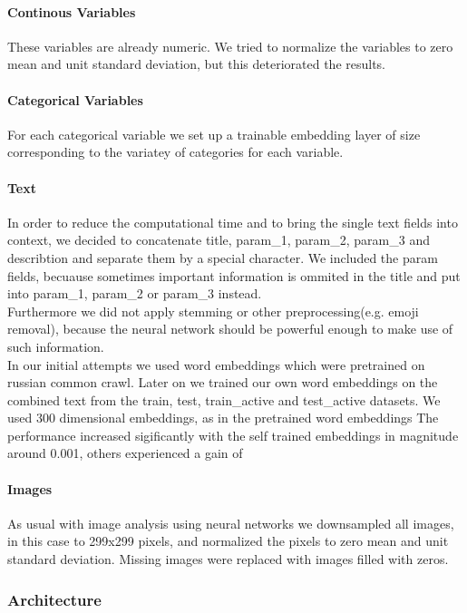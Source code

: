 \documentclass[runningheads]{llncs}
\begin{document}
 \paragraph{Continous Variables} These variables are already numeric. We tried to normalize the variables to zero mean and unit standard deviation, but this deteriorated the results. %
 \paragraph{Categorical Variables} For each categorical variable we set up a trainable embedding layer of size corresponding to the variatey of categories for each variable. %
 \paragraph{Text} In order to reduce the computational time and to bring the single text fields into context, we decided to concatenate title, param\_1, param\_2, param\_3 and  describtion and separate them by a special character. We included the param fields, becuause sometimes important information is ommited in the title and put into param\_1, param\_2 or param\_3 instead.\\
 Furthermore we did not apply stemming or other preprocessing(e.g. emoji removal), because the neural network should be powerful enough to make use of such information.\\
 In our initial attempts we used word embeddings which were pretrained on russian common crawl. Later on we trained our own word embeddings on the combined text from the train, test, train\_active and test\_active datasets. We used 300 dimensional embeddings, as in the pretrained word embeddings %
 The performance increased sigificantly with the self trained embeddings in magnitude around 0.001, others experienced a gain of %
 
 \paragraph{Images} As usual with image analysis using neural networks we downsampled all images, in this case to 299x299 pixels, and normalized the pixels to zero mean and unit standard deviation. Missing images were replaced with images filled with zeros.
 \subsubsection{Architecture}
\end{document}
